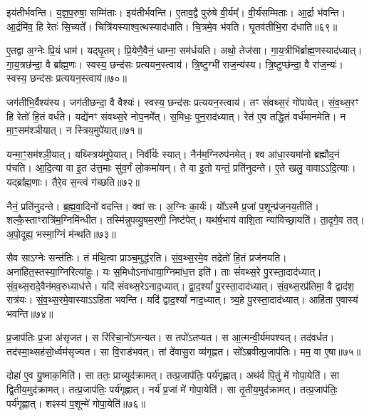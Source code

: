 इय॑तीर्भवन्ति।
य॒ज्ञ॒प॒रुषा॒ सम्मि॑ताः।
इय॑तीर्भवन्ति।
ए॒ताव॒द्वै पुरु॑षे वी॒र्यम्᳚।
वी॒र्य॑सम्मिताः।
आ॒र्द्रा भ॑वन्ति।
आ॒र्द्रमि॑व॒ हि रेतः॑ सि॒च्यते᳚।
चित्रि॑यस्याश्व॒त्थस्याद॑धाति।
चि॒त्रमे॒व भ॑वति।
घृ॒तव॑तीभि॒रा द॑धाति॥६९॥\ip

ए॒तद्वा अ॒ग्नेः प्रि॒यं धाम॑।
यद्\mbox{}घृ॒तम्।
प्रि॒येणै॒वैनं॒ धाम्ना॒ सम॑र्ध\-यति।
अथो॒ तेज॑सा।
गा॒य॒त्रीभि॑र्ब्राह्म॒णस्याद॑ध्यात्।
गा॒य॒त्र\-छ॑न्दा॒ वै ब्रा᳚ह्म॒णः।
स्वस्य॒ छन्द॑सः प्रत्ययन॒स्त्वाय॑।
त्रि॒ष्टुग्भी॑ राज॒न्य॑स्य।
त्रि॒ष्टुप्छ॑न्दा॒ वै रा॑ज॒न्यः॑।
स्वस्य॒ छन्द॑सः प्रत्ययन॒स्त्वाय॑॥७०॥\ip

जग॑तीभि॒र्वैश्य॑स्य।
जग॑तीछन्दा॒ वै वैश्यः॑।
स्वस्य॒ छन्द॑सः प्रत्ययन॒स्त्वाय॑।
तꣳ सं॑वथ्स॒रं गो॑पायेत्।
सं॒व॒थ्स॒रꣳ हि रेतो॑ हि॒तं वर्ध॑ते।
यद्ये॑नꣳ संवथ्स॒रे नोप॒नमे᳚त्।
स॒मिधः॒ पुन॒राद॑ध्यात्।
रेत॑ ए॒व तद्धि॒तं वर्ध॑मानमेति।
न मा॒ꣳ॒सम॑श्ञीयात्।
न स्त्रिय॒मुपे॑यात्॥७१॥\ip

यन्मा॒ꣳ॒सम॑श्ञी॒यात्।
यथ्स्त्रिय॑मुपे॒यात्।
निर्वी᳚र्यः स्यात्।
नैन॑म॒ग्निरुप॑नमेत्।
श्व आ॑धा॒स्यमा॑नो ब्रह्मौद॒नं प॑चति।
आ॒दि॒त्या वा इ॒त उ॑त्त॒माः सु॑व॒र्गं लो॒कमा॑यन्।
ते वा इ॒तो यन्तं॒ प्रति॑\-नुदन्ते।
ए॒ते खलु॒ वावा\-ऽऽदि॒त्याः।
यद्ब्रा᳚ह्म॒णाः।
तैरे॒व स॒न्त्वं ग॑च्छति॥७२॥\ip

नैनं॒ प्रति॑\-नुदन्ते।
ब्र॒ह्म॒वा॒दिनो॑ वदन्ति।
क्वा॑ सः।
अ॒ग्निः का॒र्यः॑।
यो᳚ऽस्मै प्र॒जां प॒शून्प्र॑ज॒नय॒तीति॑।
शल्कै॒स्ताꣳरात्रि॑म॒ग्निमि॑न्धीत।
तस्मि॑न्नुपव्यु॒षम॒रणी॒ निष्ट॑पेत्।
यथ॑र्\mbox{}ष॒भाय॑ वाशि॒ता न्या॑विच्छा॒यति॑।
ता॒दृगे॒व तत्।
अ॒पो॒दूह्य॒ भस्मा॒ग्निं म॑न्थति॥७३॥\ip

सैव साऽग्नेः सन्त॑तिः।
तं म॑थि॒त्वा प्राञ्च॒मुद्ध॑रति।
सं॒व॒थ्स॒रमे॒व तद्रेतो॑ हि॒तं प्रज॑नयति।
अना॑हित॒स्तस्या॒ग्नि\-रित्या॑हुः।
यः स॒मिधो\-ऽना॑धाया॒ग्निमा॑ध॒त्त इति॑।
ताः सं॑वथ्स॒रे पु॒रस्ता॒दाद॑ध्यात्।
सं॒व॒थ्स॒रादे॒वैन॑मव॒रुध्याध॑त्ते।
यदि॑ संवथ्स॒रे\-ऽनाद॒ध्यात्।
द्वा॒द॒श्यां᳚ पु॒रस्ता॒दाद॑ध्यात्।
सं॒व॒थ्स॒रप्र॑तिमा॒ वै द्वाद॑श॒ रात्र॑यः।
सं॒व॒थ्स॒रमे॒वास्याऽऽहि॑ता भवन्ति।
यदि॑ द्वाद॒श्यां᳚ नाद॒ध्यात्।
त्र्य॒हे पु॒रस्ता॒दाद॑ध्यात्।
आहि॑ता ए॒वास्य॑ भवन्ति॥७४॥\ip{}

प्र॒जा\-प॑तिः प्र॒जा अ॑\-सृजत।
स रि॑रिचा॒नो॑\-ऽमन्यत।
स तपो॑\-ऽतप्यत।
स आ॒त्मन्वी॒र्य॑मपश्यत्।
तद॑वर्धत।
तद॑स्मा॒थ्सह॑सो॒र्ध्वम॑सृज्यत।
सा वि॒राड॑भवत्।
तां दे॑वासु॒रा व्य॑गृह्णत।
सो᳚ऽब्रवीत्प्र॒जा\-प॑तिः।
मम॒ वा ए॒षा॥७५॥\ip

दोहा॑ ए॒व यु॒ष्माक॒मिति॑।
सा ततः॒ प्राच्युद॑क्रामत्।
तत्प्र॒जा\-प॑तिः॒ पर्य॑गृह्णात्।
अथ॑र्व पि॒तुं मे॑ गोपा॒येति॑।
सा द्वि॒तीय॒मुद॑क्रामत्।
तत्प्र॒जा\-प॑तिः॒ पर्य॑गृह्णात्।
नर्य॑ प्र॒जां मे॑ गोपा॒येति॑।
सा तृ॒तीय॒\-मुद॑\-क्रामत्।
तत्प्र॒जा\-प॑तिः॒ पर्य॑गृह्णात्।
शꣴस्य॑ प॒शून्मे॑ गोपा॒येति॑॥७६॥\ip

